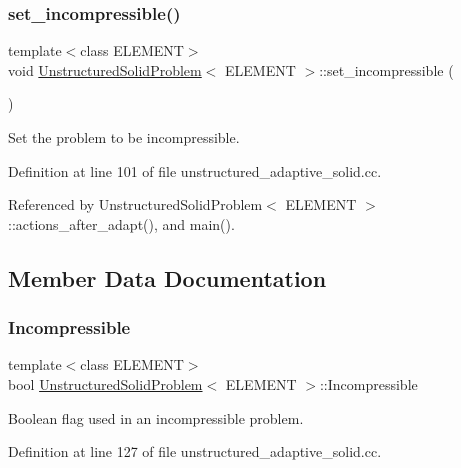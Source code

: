 \subsubsection{\texorpdfstring{set\+\_\+incompressible()}{set\_incompressible()}}
{\footnotesize\ttfamily template$<$class E\+L\+E\+M\+E\+NT$>$ \\
void \hyperlink{classUnstructuredSolidProblem}{Unstructured\+Solid\+Problem}$<$ E\+L\+E\+M\+E\+NT $>$\+::set\+\_\+incompressible (\begin{DoxyParamCaption}{ }\end{DoxyParamCaption})\hspace{0.3cm}{\ttfamily [inline]}}



Set the problem to be incompressible. 



Definition at line 101 of file unstructured\+\_\+adaptive\+\_\+solid.\+cc.



Referenced by Unstructured\+Solid\+Problem$<$ E\+L\+E\+M\+E\+N\+T $>$\+::actions\+\_\+after\+\_\+adapt(), and main().



\subsection{Member Data Documentation}
\mbox{\label{classUnstructuredSolidProblem_a956386972054504cdc23fd970b126934}} 
\subsubsection{\texorpdfstring{Incompressible}{Incompressible}}
{\footnotesize\ttfamily template$<$class E\+L\+E\+M\+E\+NT$>$ \\
bool \hyperlink{classUnstructuredSolidProblem}{Unstructured\+Solid\+Problem}$<$ E\+L\+E\+M\+E\+NT $>$\+::Incompressible\hspace{0.3cm}{\ttfamily [private]}}



Boolean flag used in an incompressible problem. 



Definition at line 127 of file unstructured\+\_\+adaptive\+\_\+solid.\+cc.



